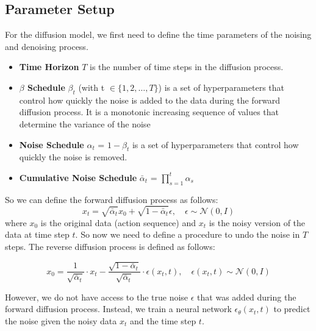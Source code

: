\documentclass[11pt,a4paper]{article}
\begin{document}
\subsection*{Parameter Setup}
For the diffusion model, we first need to define the time parameters of the 
noising and denoising process.
\begin{itemize}[leftmargin=1.5em]
  \item \textbf{Time Horizon} $T$ is the number of time steps in the diffusion process.
  \item \textbf{$\beta$ Schedule} $\beta_t$ (with t $\in \{1,2, \ldots ,T\}$) is a set of hyperparameters that control
  how quickly the noise is added to the data during the forward diffusion process.
  It is a monotonic increasing sequence of values that determine the variance of the noise
  \item \textbf{Noise Schedule} $\alpha_t$ = $1 - \beta_t$ is a set of hyperparameters 
  that control how quickly the noise is removed.
  \item \textbf{Cumulative Noise Schedule} $\bar{\alpha}_t$ = $\prod_{s=1}^{t} \alpha_s$ 
\end{itemize}
So we can define the forward diffusion process as follows:
\begin{equation}
  x_t = \sqrt{\bar{\alpha}_t} x_0 + \sqrt{1 - \bar{\alpha}_t} \epsilon, \quad \epsilon \sim \mathcal{N}(0, I)
\end{equation}
where $x_0$ is the original data (action sequence) and $x_t$ is the noisy version of the data at time step $t$.
So now we need to define a procedure to undo the noise in $T$ steps.
The reverse diffusion process is defined as follows:

\begin{equation}
  x_0 = \frac{1}{\sqrt{\bar{\alpha}_t}} \cdot x_t - \frac{\sqrt{1 - \bar{\alpha}_t}}{\sqrt{\bar{\alpha}_t}} \cdot \epsilon (x_t, t), \quad \epsilon (x_t, t) \sim \mathcal{N}(0, I)  
\end{equation}

However, we do not have access to the true noise $\epsilon$ that was added
during the forward diffusion process. Instead, we train a neural network $\epsilon_\theta(x_t, t)$
to predict the noise given the noisy data $x_t$ and the time step $t$.
\end{document}
